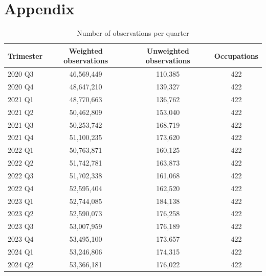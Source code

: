 \section{Appendix}

\begin{table}[H]
  \centering
  \caption{\label{tab:obs_per_quarter}Number of observations per quarter}
  \centering
  \begin{threeparttable}
    \begin{tabular}[t]{lccc}
      \toprule
      Trimester & Weighted observations & Unweighted observations & Occupations \\
      \midrule
      2020 Q3   & 46,569,449            & 110,385                 & 422         \\
      2020 Q4   & 48,647,210            & 139,327                 & 422         \\
      2021 Q1   & 48,770,663            & 136,762                 & 422         \\
      2021 Q2   & 50,462,809            & 153,040                 & 422         \\
      2021 Q3   & 50,253,742            & 168,719                 & 422         \\
      2021 Q4   & 51,100,235            & 173,620                 & 422         \\
      2022 Q1   & 50,763,871            & 160,125                 & 422         \\
      2022 Q2   & 51,742,781            & 163,873                 & 422         \\
      2022 Q3   & 51,702,338            & 161,068                 & 422         \\
      2022 Q4   & 52,595,404            & 162,520                 & 422         \\
      2023 Q1   & 52,744,085            & 184,138                 & 422         \\
      2023 Q2   & 52,590,073            & 176,258                 & 422         \\
      2023 Q3   & 53,007,959            & 176,189                 & 422         \\
      2023 Q4   & 53,495,100            & 173,657                 & 422         \\
      2024 Q1   & 53,246,806            & 174,315                 & 422         \\
      2024 Q2   & 53,366,181            & 176,022                 & 422         \\

\end{tabular}
\end{threeparttable}
\end{table}
